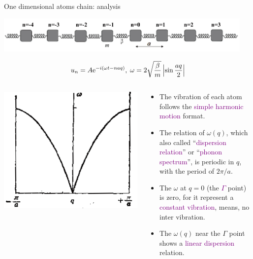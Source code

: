 \documentclass{beamer}
\begin{document}
\begin{frame}{One dimensional atoms chain: analysis}\small
  \begin{center}
    \includegraphics[width=0.95\textwidth]{figure/atom_chain.png}
  \end{center}
  \begin{equation*}\small
      u_n = A\mathrm{e}^{-i(\omega{}t-naq)}, \;\omega = 2\sqrt{\frac{\beta}{m}}\left|\sin\frac{aq}{2}\right|
  \end{equation*}
  \begin{columns}
    \begin{column}{0.35\textwidth}
      \includegraphics[width=\textwidth]{figure/1dc-solution.png}
    \end{column}
    \begin{column}{0.65\textwidth}
      \begin{block}{}\begin{itemize}\footnotesize
        \item The vibration of each atom follows the \textcolor{purple}{simple harmonic motion} format.
        \item The relation of \(\omega(q)\), which also called 
        ``\textcolor{purple}{dispersion relation}'' or ``\textcolor{purple}{phonon spectrum}'', is periodic in \(q\), with the period of \(2\pi/a\).
        \item The \(\omega\) at \(q=0\) (the \textcolor{purple}{\(\Gamma\)} point) is zero, for it represent a \textcolor{purple}{constant vibration}, means, no inter vibration.
        \item The \(\omega(q)\) near the \(\Gamma\) point shows a \textcolor{purple}{linear dispersion} relation.
      \end{itemize}\end{block}
    \end{column}
  \end{columns}
\end{frame}
\end{document}
